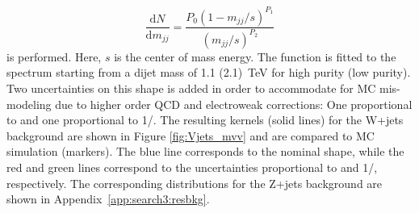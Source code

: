 \begin{equation}
\frac{\text{d} N}{\text{d} m_{jj}} = \frac{P_0 (1-m_{jj}/s)^{P_1}}{(m_{jj}/s)^{P_2}}
\end{equation}
is performed. Here, $s$ is the center of mass energy. The function is fitted to the spectrum starting from a dijet mass of 1.1 (2.1)~TeV for high purity (low purity). Two uncertainties on this shape is added in order to accommodate for MC mis-modeling due to higher order QCD and electroweak corrections: One proportional to \MVV and one proportional to 1/\MVV. The resulting \MVV kernels (solid lines) for the W+jets background are shown in Figure \ref{fig:Vjets_mvv} and are compared to MC simulation (markers). The blue line corresponds to the nominal shape, while the red and green lines correspond to the uncertainties proportional to \MVV and 1/\MVV, respectively. The corresponding distributions for the Z+jets background are shown in Appendix~\ref{app:search3:resbkg}.\par
